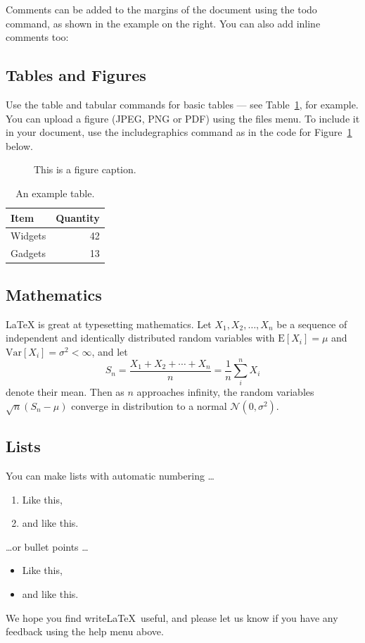 	Comments can be added to the margins of the document using the  todo command, as shown in the example on the right. You can also add inline comments too:
	
	
	\subsection{Tables and Figures}
	
	Use the table and tabular commands for basic tables --- see Table~\ref{tab:widgets}, for example. You can upload a figure (JPEG, PNG or PDF) using the files menu. To include it in your document, use the includegraphics command as in the code for Figure~\ref{fig:frog} below.
	
	\begin{figure}
		\centering
		\caption{\label{fig:frog}This is a figure caption.}
	\end{figure}
	
	\begin{table}
		\centering
		\begin{tabular}{l|r}
			Item & Quantity \\\hline
			Widgets & 42 \\
			Gadgets & 13
		\end{tabular}
		\caption{\label{tab:widgets}An example table.}
	\end{table}
	
	\subsection{Mathematics}
	
	\LaTeX{} is great at typesetting mathematics. Let $X_1, X_2, \ldots, X_n$ be a sequence of independent and identically distributed random variables with $\text{E}[X_i] = \mu$ and $\text{Var}[X_i] = \sigma^2 < \infty$, and let
	$$S_n = \frac{X_1 + X_2 + \cdots + X_n}{n}
	= \frac{1}{n}\sum_{i}^{n} X_i$$
	denote their mean. Then as $n$ approaches infinity, the random variables $\sqrt{n}(S_n - \mu)$ converge in distribution to a normal $\mathcal{N}(0, \sigma^2)$.
	
	\subsection{Lists}
	
	You can make lists with automatic numbering \dots
	
	\begin{enumerate}
		\item Like this,
		\item and like this.
	\end{enumerate}
	\dots or bullet points \dots
	\begin{itemize}
		\item Like this,
		\item and like this.
	\end{itemize}
	
	We hope you find write\LaTeX\ useful, and please let us know if you have any feedback using the help menu above.
	
